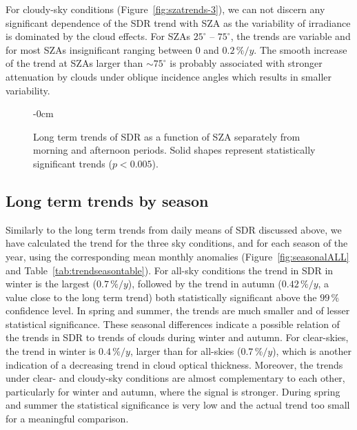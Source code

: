 \documentclass[applsci,article,submit,moreauthors,pdftex]{Definitions/mdpi}
\begin{document}
For cloudy-sky conditions (Figure~\ref{fig:szatrends-3}), we can not
discern any significant dependence of the SDR trend with SZA as the
variability of irradiance is dominated by the cloud effects. For SZAs
\(25^\circ\) -- \(75^\circ\), the trends are variable and for most SZAs
insignificant ranging between \(0\) and \(0.2\,\%/y\). The smooth
increase of the trend at SZAs larger than \(\sim 75^\circ\) is probably
associated with stronger attenuation by clouds under oblique incidence
angles which results in smaller variability.

\begin{figure}[h!]
    \begin{adjustwidth}{-\extralength}{0cm}
        {\centering 
            \hfill
            \hfill
        }
        \caption{Long term trends of SDR as a function of SZA separately from morning and afternoon periods. Solid shapes  represent statistically significant trends ($p < 0.005$).}\label{fig:szatrends}
    \end{adjustwidth}
\end{figure}

\hypertarget{long-term-trends-by-season}{%
\subsection{Long term trends by
season}\label{long-term-trends-by-season}}

Similarly to the long term trends from daily means of SDR discussed
above, we have calculated the trend for the three sky conditions, and
for each season of the year, using the corresponding mean monthly
anomalies (Figure~\ref{fig:seasonalALL} and
Table~\ref{tab:trendseasontable}). For all-sky conditions the trend in
SDR in winter is the largest (\(0.7\,\%/y\)), followed by the trend in
autumn (\(0.42\,\%/y\), a value close to the long term trend) both
statistically significant above the \(99\,\%\) confidence level. In
spring and summer, the trends are much smaller and of lesser statistical
significance. These seasonal differences indicate a possible relation of
the trends in SDR to trends of clouds during winter and autumn. For
clear-skies, the trend in winter is \(0.4\,\%/y\), larger than for
all-skies (\(0.7\,\%/y\)), which is another indication of a decreasing
trend in cloud optical thickness. Moreover, the trends under clear- and
cloudy-sky conditions are almost complementary to each other,
particularly for winter and autumn, where the signal is stronger. During
spring and summer the statistical significance is very low and the
actual trend too small for a meaningful comparison.
\end{document}
